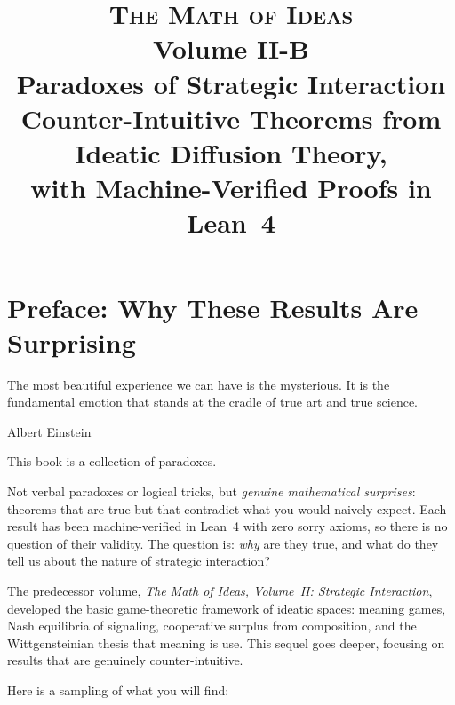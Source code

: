\documentclass[11pt,openany]{book}
\title{%
  \vspace{-2cm}
  {\LARGE\scshape The Math of Ideas}\\[0.3cm]
  {\Large Volume II-B}\\[0.5cm]
  {\huge\bfseries Paradoxes of Strategic Interaction}\\[1cm]
  {\large Counter-Intuitive Theorems from Ideatic Diffusion Theory,\\
  with Machine-Verified Proofs in Lean~4}
}
\author{}
\date{}
\theoremstyle{definition}
\theoremstyle{plain}
\theoremstyle{remark}
\begin{document}
\maketitle

\tableofcontents

\chapter*{Preface: Why These Results Are Surprising}

\epigraph{The most beautiful experience we can have is the mysterious. It is the fundamental emotion that stands at the cradle of true art and true science.}{Albert Einstein}

This book is a collection of paradoxes.

Not verbal paradoxes or logical tricks, but \emph{genuine mathematical surprises}: theorems that are true but that contradict what you would naively expect. Each result has been machine-verified in Lean~4 with zero sorry axioms, so there is no question of their validity. The question is: \emph{why} are they true, and what do they tell us about the nature of strategic interaction?

The predecessor volume, \emph{The Math of Ideas, Volume~II: Strategic Interaction}, developed the basic game-theoretic framework of ideatic spaces: meaning games, Nash equilibria of signaling, cooperative surplus from composition, and the Wittgensteinian thesis that meaning is use. This sequel goes deeper, focusing on results that are genuinely counter-intuitive.

Here is a sampling of what you will find:
\end{document}
